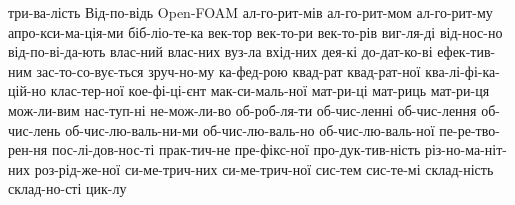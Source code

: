 
\hyphenation
{
  три-ва-лість
  Від-по-відь
  Open-FOAM
  ал-го-рит-мів
  ал-го-рит-мом
  ал-го-рит-му
  апро-кси-ма-ція-ми
  біб-ліо-те-ка
  век-тор
  век-то-ри
  век-то-рів
  виг-ля-ді
  від-нос-но
  від-по-ві-да-ють
  влас-ний
  влас-них
  вуз-ла
  вхід-них
  дея-кі
  до-дат-ко-ві
  ефек-тив-ним
  зас-то-со-вує-ться
  зруч-но-му
  ка-фед-рою
  квад-рат
  квад-рат-ної
  ква-лі-фі-ка-цій-но
  клас-тер-ної
  кое-фі-ці-єнт
  мак-си-маль-ної
  мат-ри-ці
  мат-риць
  мат-ри-ця
  мож-ли-вим
  нас-туп-ні
  не-мож-ли-во
  об-роб-ля-ти
  об-чис-ленні
  об-чис-лення
  об-чис-лень
  об-чис-лю-валь-ни-ми
  об-чис-лю-валь-но
  об-чис-лю-валь-ної
  пе-ре-тво-рен-ня
  пос-лі-дов-нос-ті
  прак-тич-не
  пре-фікс-ної
  про-дук-тив-ність
  різ-но-ма-ніт-них
  роз-рід-же-ної
  си-ме-трич-них
  си-ме-трич-ної
  сис-тем
  сис-те-мі
  склад-ність
  склад-но-сті
  цик-лу
}



\ESKDsetPadding{10mm}{10mm}

\makeatletter
\renewcommand{\l@section}{\@dottedtocline{0}{1.5em}{2.3em}}
\renewcommand{\l@subsection}{\@dottedtocline{1}{2.5em}{2.3em}}
\renewcommand{\l@subsubsection}{\@dottedtocline{2}{3.5em}{2.3em}}
\makeatother

\newcommand{\docseparator}[1]{
  \newpage
  \thispagestyle{empty}
  \ESKDthisStyle{empty}
  \noindent\parbox[c][\vsize][c]{\hsize}
  {\centering\fontsize{36pt}{40pt}\selectfont#1}

  \setcounter{page}{0}
  \setcounter{section}{0}
  \setcounter{subsection}{0}
  \setcounter{subsubsection}{0}
}

\newcommand{\apptitletop}[1]{%
ДОДАТОК #1\par
Алгоритм динамічної маршрутизації мультікастової розсилки}

\newcommand{\apptitlepages}[1]{%
Аркушів \pageref{LastPage}\par}

\newcommand{\appendixtitle}[3]{
  \newpage
  \thispagestyle{empty}
  \ESKDthisStyle{empty}
  \noindent
  \parbox[t][0.15\vsize][t]{\hsize}
  {\centering\large\apptitletop{#1}}
  \parbox[t][0.4\vsize][c]{\hsize}
  {\centering\Large\textbf{#2}\par#3}
  \parbox[t][0.20\vsize][c]{\hsize}{~~}
  \parbox[t][0.08\vsize][t]{\hsize}
  {\centering\apptitlepages}
  \vfill
  \noindent\parbox[c]{\hsize}{\centering\titlebottom}

  \setcounter{page}{0}
  \setcounter{section}{0}
  \setcounter{subsection}{0}
  \setcounter{subsubsection}{0}
}

